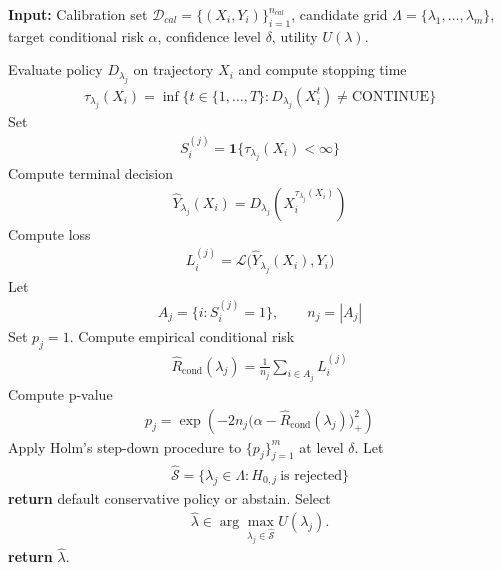 \begin{algorithm}[H]
\caption{\gls{method}: Risk Control on Stopped Samples}
\textbf{Input:} Calibration set $\mathcal{D}_{cal}=\{(X_i,Y_i)\}_{i=1}^{n_{cal}}$, candidate grid $\Lambda=\{\lambda_1,\dots,\lambda_m\}$, target conditional risk $\alpha$, confidence level $\delta$, utility $U(\lambda)$.
\begin{algorithmic}
        \STATE Evaluate policy $D_{\lambda_j}$ on trajectory $X_i$ and compute stopping time
        \begin{align*}
            \tau_{\lambda_j}(X_i)=\inf\{t\in\{1,\dots,T\}:D_{\lambda_j}(X_i^t)\neq \mathrm{CONTINUE}\}
        \end{align*}
        \STATE Set
        \begin{align*}
            S_i^{(j)}=\mathbf{1}\{\tau_{\lambda_j}(X_i)<\infty\}
        \end{align*}
            \STATE Compute terminal decision
            \begin{align*}
                \hat{Y}_{\lambda_j}(X_i)=D_{\lambda_j}(X_i^{\tau_{\lambda_j}(X_i)})
            \end{align*}
            \STATE Compute loss
            \begin{align*}
                L_i^{(j)}=\mathcal{L}\bigl(\hat{Y}_{\lambda_j}(X_i),Y_i\bigr)
            \end{align*}
        \ENDIF
    \ENDFOR
    \STATE Let
    \begin{align*}
        A_j=\{i:S_i^{(j)}=1\},\qquad n_j=|A_j|
    \end{align*}
        \STATE Set $p_j=1$.
    \ELSE
        \STATE Compute empirical conditional risk
        \begin{align*}
            \widehat{R}_{\mathrm{cond}}(\lambda_j) = \frac{1}{n_j}\sum_{i\in A_j} L_i^{(j)}
        \end{align*}
        \STATE Compute p-value
        \begin{align*}
            p_j = \exp\!\left(-2n_j\big(\alpha-\widehat{R}_{\mathrm{cond}}(\lambda_j)\big)_+^2\right)
        \end{align*}
    \ENDIF
\ENDFOR
\STATE Apply Holm's step-down procedure to $\{p_j\}_{j=1}^m$ at level $\delta$.
\STATE Let
\begin{align*}
    \widehat{\mathcal S} = \{\lambda_j \in \Lambda : H_{0,j}\ \text{is rejected}\}
\end{align*}
    \STATE \textbf{return} default conservative policy or abstain.
\ELSE
    \STATE Select
    \begin{align*}
        \hat{\lambda}
        \in
        \arg\max_{\lambda_j\in\widehat{\mathcal S}} U(\lambda_j).
    \end{align*}
    \STATE \textbf{return} $\hat{\lambda}$.
\ENDIF
\end{algorithmic}\label{eq:alg_ltt}
\end{algorithm}
\newpage

